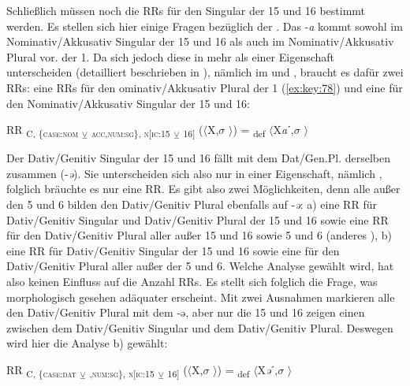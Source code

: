 Schließlich müssen noch die RRs für den Singular der  15 und 16 bestimmt werden. Es stellen sich hier einige Fragen bezüglich der . Das  -\textit{a} kommt sowohl im Nominativ/Akkusativ Singular der  15 und 16 als auch im Nominativ/Akkusativ Plural vor. der  1. Da sich jedoch diese  in mehr als einer Eigenschaft unterscheiden (detailliert beschrieben in ), nämlich im  und , braucht es dafür zwei RRs: eine RRs für den ominativ/Akkusativ Plural der  1 (\ref{ex:key:78}) und eine für den Nominativ/Akkusativ Singular der  15 und 16:

\ea%
\label{ex:key:84}
 RR \textsubscript{C, \{\textsc{case:nom}} \textsubscript{\tiny $\veebar$}\textsubscript{ \textsc{acc},\textsc{num:sg}\}, \textsc{n[}\textsc{ic:}15} \textsubscript{\tiny $\veebar$}\textsubscript{ 16]} ($\langle$X,$\sigma$ $\rangle$) = \textsubscript{def} $\langle$X\textit{a}ˊ,$\sigma$ $\rangle$\\
\z

Der Dativ/Genitiv Singular der  15 und 16 fällt mit dem Dat/Gen.Pl. derselben  zusammen (-\textit{ə}). Sie unterscheiden sich also nur in einer Eigenschaft, nämlich , folglich bräuchte es nur eine RR. Es gibt also zwei Möglichkeiten, denn alle  außer den  5 und 6 bilden den Dativ/Genitiv Plural ebenfalls auf -\textit{ə}: a) eine RR für Dativ/Genitiv Singular und Dativ/Genitiv Plural der  15 und 16 sowie eine RR für den Dativ/Genitiv Plural aller  außer 15 und 16 sowie 5 und 6 (anderes ), b) eine RR für Dativ/Genitiv Singular der  15 und 16 sowie eine für den Dativ/Genitiv Plural aller  außer der  5 und 6. Welche Analyse gewählt wird, hat also keinen Einfluss auf die Anzahl RRs. Es stellt sich folglich die Frage, was morphologisch gesehen adäquater erscheint. Mit zwei Ausnahmen markieren alle  den Dativ/Genitiv Plural mit dem  -ə, aber nur die  15 und 16 zeigen einen  zwischen dem Dativ/Genitiv Singular und dem Dativ/Genitiv Plural. Deswegen wird hier die Analyse b) gewählt:

\ea%
\label{ex:key:85}
 RR \textsubscript{C, \{\textsc{case:dat}} \textsubscript{\tiny $\veebar$}\textsubscript{ \GEN,\textsc{num:sg}\}, \textsc{n[}\textsc{ic:}15} \textsubscript{\tiny $\veebar$}\textsubscript{ 16]} ($\langle$X,$\sigma$ $\rangle$) = \textsubscript{def} $\langle$X\textit{ə}ˊ,$\sigma$ $\rangle$\\
\z

